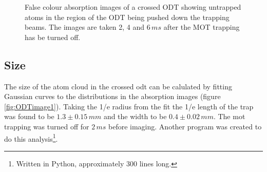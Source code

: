 \begin{figure}[h]
\begin{subfigure}[b]{0.3\textwidth}
    \end{subfigure}\begin{subfigure}[b]{0.3\textwidth}
    \end{subfigure}
\caption{False colour absorption images of a crossed ODT showing untrapped atoms in the region of the ODT being pushed down the trapping beams. The images are taken 2, 4 and $6\,\unit{ms}$ after the MOT trapping has be turned off.}
\label{fig:crossed_effect}
\end{figure}

\subsection{Size}
The size of the atom cloud in the crossed \gls{odt} can be calulated by fitting Gaussian curves to the distributions in the absorption images (figure \ref{fig:ODTimage1}). Taking the 1/e radius from the fit the 1/e length of the trap was found to be $1.3\pm0.15\,\unit{mm}$ and the width to be $0.4\pm0.02\,\unit{mm}$. The \gls{mot} trapping was turned off for $2\,\unit{ms}$ before imaging. Another program was created to do this analysis\footnote{Written in Python, approximately 300 lines long.}.

